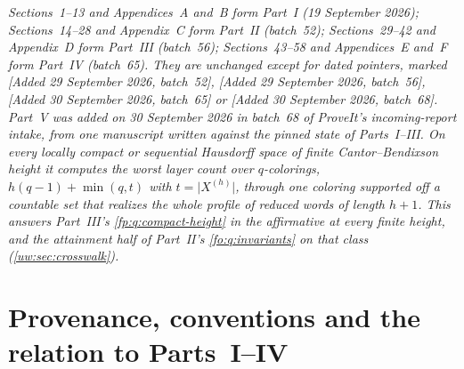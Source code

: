 \documentclass[11pt,letterpaper]{article}
\numberwithin{equation}{section}
\theoremstyle{definition}
\theoremstyle{remark}
\theoremstyle{definition}
\begin{document}
\noindent\emph{Sections~1--13 and Appendices~A and~B form Part~I (19 September
2026); Sections~14--28 and Appendix~C form Part~II (batch~52); Sections~29--42
and Appendix~D form Part~III (batch~56); Sections~43--58 and Appendices~E
and~F form Part~IV (batch~65). They are unchanged except for dated pointers,
marked \textup{[Added 29 September 2026, batch~52]}, \textup{[Added 29
September 2026, batch~56]}, \textup{[Added 30 September 2026, batch~65]} or
\textup{[Added 30 September 2026, batch~68]}. Part~V was added on 30
September 2026 in batch~68 of ProveIt's incoming-report intake, from one
manuscript written against the pinned state of Parts~I--III. On every
locally compact or sequential Hausdorff space of finite Cantor--Bendixson
height it computes the worst layer count over $q$-colorings,
$h(q-1)+\min(q,t)$ with $t=\lvert X^{(h)}\rvert$, through one coloring
supported off a countable set that realizes the whole profile of reduced
words of length $h+1$. This answers Part~III's \cref{fp:q:compact-height}
in the affirmative at every finite height, and the attainment half of
Part~II's \cref{fo:q:invariants} on that class (\cref{uw:sec:crosswalk}).}

\section{Provenance, conventions and the relation to Parts~I--IV}
\label{uw:sec:provenance}
\end{document}
